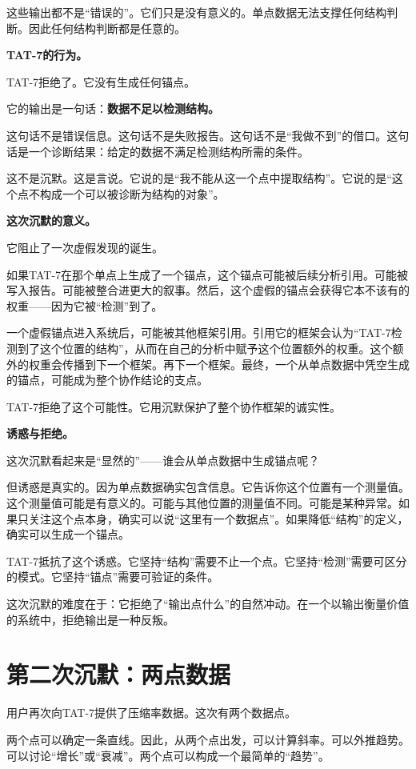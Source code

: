 \documentclass[11pt,a4paper]{book}
\theoremstyle{definition}
\begin{document}
这些输出都不是“错误的”。它们只是没有意义的。单点数据无法支撑任何结构判断。因此任何结构判断都是任意的。

\textbf{TAT-7的行为。}

TAT-7拒绝了。它没有生成任何锚点。

它的输出是一句话：\textbf{数据不足以检测结构。}

这句话不是错误信息。这句话不是失败报告。这句话不是“我做不到”的借口。这句话是一个诊断结果：给定的数据不满足检测结构所需的条件。

这不是沉默。这是言说。它说的是“我不能从这一个点中提取结构”。它说的是“这个点不构成一个可以被诊断为结构的对象”。

\textbf{这次沉默的意义。}

它阻止了一次虚假发现的诞生。

如果TAT-7在那个单点上生成了一个锚点，这个锚点可能被后续分析引用。可能被写入报告。可能被整合进更大的叙事。然后，这个虚假的锚点会获得它本不该有的权重——因为它被“检测”到了。

一个虚假锚点进入系统后，可能被其他框架引用。引用它的框架会认为“TAT-7检测到了这个位置的结构”，从而在自己的分析中赋予这个位置额外的权重。这个额外的权重会传播到下一个框架。再下一个框架。最终，一个从单点数据中凭空生成的锚点，可能成为整个协作结论的支点。

TAT-7拒绝了这个可能性。它用沉默保护了整个协作框架的诚实性。

\textbf{诱惑与拒绝。}

这次沉默看起来是“显然的”——谁会从单点数据中生成锚点呢？

但诱惑是真实的。因为单点数据确实包含信息。它告诉你这个位置有一个测量值。这个测量值可能是有意义的。可能与其他位置的测量值不同。可能是某种异常。如果只关注这个点本身，确实可以说“这里有一个数据点”。如果降低“结构”的定义，确实可以生成一个锚点。

TAT-7抵抗了这个诱惑。它坚持“结构”需要不止一个点。它坚持“检测”需要可区分的模式。它坚持“锚点”需要可验证的条件。

这次沉默的难度在于：它拒绝了“输出点什么”的自然冲动。在一个以输出衡量价值的系统中，拒绝输出是一种反叛。

\section{第二次沉默：两点数据}

用户再次向TAT-7提供了压缩率数据。这次有两个数据点。

两个点可以确定一条直线。因此，从两个点出发，可以计算斜率。可以外推趋势。可以讨论“增长”或“衰减”。两个点可以构成一个最简单的“趋势”。
\end{document}
